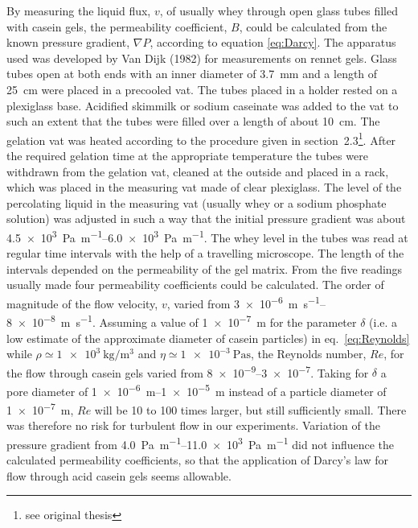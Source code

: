 \documentclass[12pt,a4paper]{article}
\begin{document}
By measuring the liquid flux, $v$, of usually whey through open glass tubes filled with casein gels, the permeability coefficient, $B$, could be calculated from the known pressure gradient, $\nabla P$, according to equation \ref{eq:Darcy}. The apparatus used was developed by Van Dijk (1982) for measurements on rennet gels. Glass tubes open at both ends with an inner diameter of \SI{3.7}{\milli\metre} and a length of \SI{25}{\centi\metre} were placed in a precooled vat. The tubes placed in a holder rested on a plexiglass base. Acidified skimmilk or sodium caseinate was added to the vat to such an extent that the tubes were filled over a length of about \SI{10}{\centi\metre}. The gelation vat was heated according to the procedure given in section~2.3\footnote{see original thesis}. After the required gelation time at the appropriate temperature the tubes were withdrawn from the gelation vat, cleaned at the outside and placed in a rack, which was placed in the measuring vat made of clear plexiglass. The level of the percolating liquid in the measuring vat (usually whey or a sodium phosphate solution) was adjusted in such a way that the initial pressure gradient was about \SIrange{4.5e3}{6.0e3}{\pascal\per\metre}. The whey level in the tubes was read at regular time intervals with the help of a travelling microscope. The length of the intervals depended on the permeability of the gel matrix. From the five readings usually made four permeability coefficients could be calculated. The order of magnitude of the flow velocity, $v$, varied from \SIrange{3e-6}{8e-8}{\metre\per\second}. Assuming a value of \SI{1e-7}{\metre} for the parameter $\delta$ (i.e. a low estimate of the approximate diameter of casein particles) in eq.~\ref{eq:Reynolds} while $\rho\simeq \SI{1e3}{\kilo\gram\per\cubic\metre}$ and $\eta \simeq \SI{1e-3}{\pascal\second}$, the Reynolds number, $Re$, for the flow through casein gels varied from \SIrange{8e-9}{3e-7}{}. Taking for $\delta$ a pore diameter of \SIrange{1e-6}{1e-5}{\metre} instead of a particle diameter of \SI{1e-7}{\metre}, $Re$ will be 10 to 100 times larger, but still sufficiently small. There was therefore no risk for turbulent flow in our experiments. Variation of the pressure gradient from \SIrange{4.0}{11.0e3}{\pascal\per\metre} did not influence the calculated permeability coefficients, so that the application of Darcy's law for flow through acid casein gels seems allowable.
\end{document}

